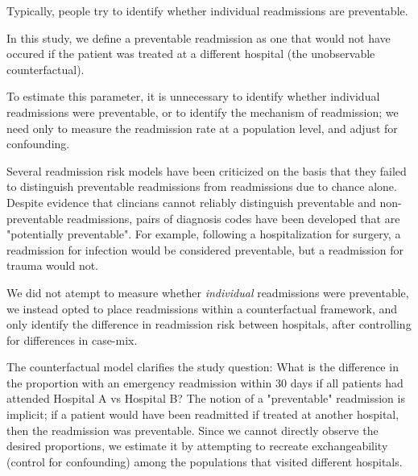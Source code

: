 \documentclass[]{article}\usepackage[]{graphicx}\usepackage[]{color}
\begin{document}
Typically, people try to identify whether individual readmissions are preventable.

In this study, we define a preventable readmission as one that would not have occured if the patient was treated at a different hospital (the unobservable counterfactual). 

To estimate this parameter, it is unnecessary to identify whether individual readmissions were preventable, or to identify the mechanism of readmission; we need only to measure the readmission rate at a population level, and adjust for confounding.

Several readmission risk models have been criticized on the basis that they failed to distinguish preventable readmissions from readmissions due to chance alone. Despite evidence that clincians cannot reliably distinguish preventable and non-preventable readmissions, pairs of diagnosis codes have been developed that are "potentially preventable". For example, following a hospitalization for surgery, a readmission for infection would be considered preventable, but a readmission for trauma would not.

We did not atempt to measure whether \emph{individual} readmissions were preventable, we instead opted to place readmissions within a counterfactual framework, and only identify the difference in readmission risk between hospitals, after controlling for differences in case-mix.

The counterfactual model clarifies the study question: What is the difference in the proportion with an emergency readmission within 30 days if all patients had attended Hospital A vs Hospital B? The notion of a "preventable" readmission is implicit; if a patient would have been readmitted if treated at another hospital, then the readmission was preventable. Since we cannot directly observe the desired proportions, we estimate it by attempting to recreate exchangeability (control for confounding) among the populations that visited different hospitals.


\end{document}
